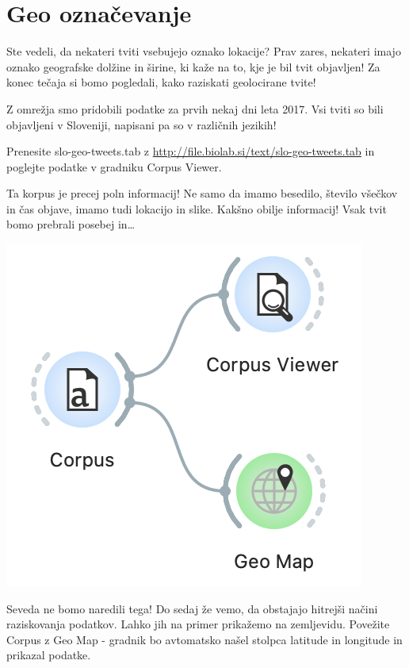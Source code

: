 \chapter{Geo označevanje}
\label{ch:geo-oznacevanje}

Ste vedeli, da nekateri tviti vsebujejo oznako lokacije? Prav zares, nekateri imajo oznako geografske dolžine in širine, ki kaže na to, kje je bil tvit objavljen! Za konec tečaja si bomo pogledali, kako raziskati geolocirane tvite!

Z omrežja smo pridobili podatke za prvih nekaj dni leta 2017. Vsi tviti so bili objavljeni v Sloveniji, napisani pa so v različnih jezikih!

Prenesite slo-geo-tweets.tab z \url{http://file.biolab.si/text/slo-geo-tweets.tab} in poglejte podatke v gradniku Corpus Viewer.

Ta korpus je precej poln informacij! Ne samo da imamo besedilo, število všečkov in čas objave, imamo tudi lokacijo in slike. Kakšno obilje informacij! Vsak tvit bomo prebrali posebej in…

\begin{marginfigure}[0cm]
    \includegraphics[width=\linewidth]{geo-workflow.png}
    \caption{}
\end{marginfigure}

Seveda ne bomo naredili tega! Do sedaj že vemo, da obstajajo hitrejši načini raziskovanja podatkov. Lahko jih na primer prikažemo na zemljevidu. Povežite Corpus z Geo Map - gradnik bo avtomatsko našel stolpca latitude in longitude in prikazal podatke.

